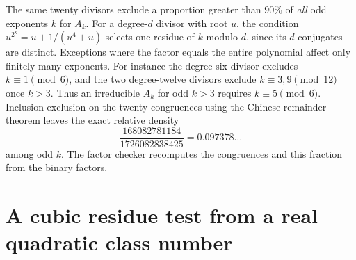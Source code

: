 \documentclass[11pt]{article}
\begin{document}
The same twenty divisors exclude a proportion greater than \(90\%\)
of \emph{all} odd exponents \(k\) for \(A_k\).
For a degree-\(d\) divisor with root \(u\), the condition
\(u^{2^k}=u+1/(u^4+u)\) selects one residue of \(k\) modulo \(d\),
since its \(d\) conjugates are distinct. Exceptions where the factor
equals the entire polynomial affect only finitely many exponents.
For instance the degree-six divisor excludes \(k\equiv1\pmod6\),
and the two degree-twelve divisors exclude \(k\equiv3,9\pmod{12}\)
once \(k>3\). Thus an irreducible \(A_k\) for odd \(k>3\) requires
\(k\equiv5\pmod6\). Inclusion-exclusion on the twenty congruences
using the Chinese remainder theorem leaves the exact relative density
\[
       \frac{168082781184}{1726082838425}=0.097378\ldots
\]
among odd \(k\). The factor checker recomputes the congruences and
this fraction from the binary factors.

\clearpage
\section{A cubic residue test from a real quadratic class number}
\label{sec:torus-cubic-class}
\end{document}

